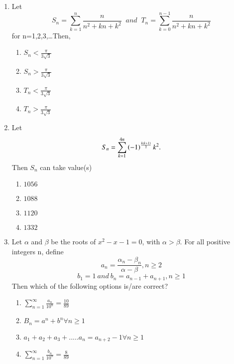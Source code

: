 \documentclass[journal,12pt,twocolumn]{IEEEtran}
\theoremstyle{remark}
\begin{document}
\begin{enumerate}
\item Let 
\begin{equation*}
S_n=\sum_{k=1}^{n}\frac{n}{n^2+kn+k^2} \;\; and \;\; T_n=\sum_{k=0}^{n-1}\frac{n}{n^2+kn+k^2}
\end{equation*}
for\;\; n=1,2,3,\dots Then,\hfill{}
\begin{multicols}{2}
\begin{enumerate}
\item $S_n<\frac{\pi}{3\sqrt{3}}$
\item $S_n>\frac{\pi}{3\sqrt{3}}$
\item $T_n<\frac{\pi}{3\sqrt{3}}$
\item $T_n>\frac{\pi}{3\sqrt{3}}$
\end{enumerate}
\end{multicols}

\item Let \begin{equation*} S_n=\sum_{k=1}^{4n}\left(-1\right)^\frac{k\left(k+1\right)}{2}k^2.\end{equation*}  Then $S_n$ can take value(s)  \hfill{}
\begin{multicols}{2}
\begin{enumerate}
\item $1056$
\item $1088$
\item $1120$
\item $1332$
\end{enumerate}
\end{multicols}

\item Let $\alpha$ and $\beta$ be the roots of $x^2-x-1=0$, with $\alpha>\beta$. For all positive integers n, define
\begin{equation*}
a_n=\frac{\alpha_n-\beta_n}{\alpha-\beta},n\geq2
\end{equation*}
\begin{equation*}
b_1=1 \: and \: b_n=a_{n-1}+a_{n+1},n\geq1
\end{equation*}
Then which of the following options is/are correct?
\hfill{}
\begin{enumerate}
\item $\sum_{n=1}^{\infty}\frac{a_n}{10^n}=\frac{10}{89}$
\item $B_n=a^n+b^n \forall n\geq1$
\item $a_1+a_2+a_3+.....a_n=a_{n+2}-1 \forall n\geq1$
\item $\sum_{n=1}^{\infty}\frac{b_n}{10^n}=\frac{8}{89}$
\end{enumerate}
\end{enumerate}
\end{document}
